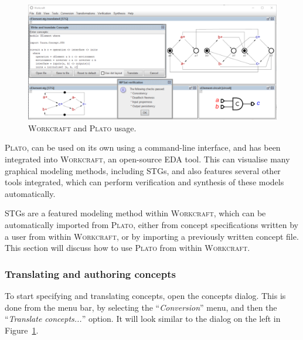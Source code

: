 \documentclass[british,conference,compsoc]{IEEEtran}
\newcommand{\noun}[1]{\textsc{#1}}
\begin{document}
\begin{figure}[t]
\begin{centering}
\vspace{-3mm}
\includegraphics[scale=0.55]{Images/workcraft_design_flow.png}
\par\end{centering}
\begin{centering}
\protect\caption{\label{fig:design_flow_screenshot}\noun{Workcraft} and 
			\noun{Plato} usage.}
\par\end{centering}
\vspace{-3mm}
\end{figure}

\noun{Plato}, can be used on its own using a command-line interface, and has been
integrated into \noun{Workcraft}, an open-source EDA tool. This can visualise many graphical modeling
methods, including STGs, and also features several other tools integrated, which can perform verification
and synthesis of these models automatically.

STGs are a featured modeling method within \noun{Workcraft},
which can be automatically imported from \noun{Plato}, either from concept specifications written by a user from within 
\noun{Workcraft}, or by importing a previously written concept file. 
This section will discuss how to use \noun{Plato} from within
\noun{Workcraft}.

\vspace{-3.2mm}
 
\subsubsection{Translating and authoring concepts}

To start specifying and translating concepts, open the concepts dialog.  This is
done from the menu bar, by selecting the ``\emph{Conversion}'' menu, and then
the ``\emph{Translate concepts...}'' option. It will look similar to the dialog 
on the left in Figure~\ref{fig:design_flow_screenshot}.
\end{document}
